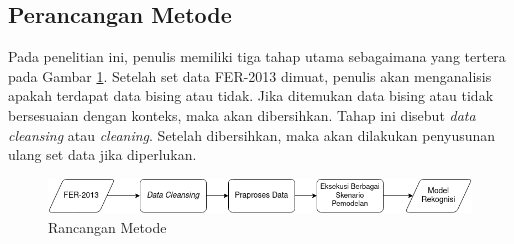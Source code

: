 \subsection{Perancangan Metode}
Pada penelitian ini, penulis memiliki tiga tahap utama sebagaimana yang tertera pada Gambar \ref{fig:rancanganmetode}. Setelah set data FER-2013 dimuat, penulis akan menganalisis apakah terdapat data bising atau tidak. Jika ditemukan data bising atau tidak bersesuaian dengan konteks, maka akan dibersihkan.  Tahap ini disebut \textit{data cleansing} atau \textit{cleaning}. Setelah dibersihkan, maka akan dilakukan penyusunan ulang set data jika diperlukan.
\begin{figure}
    \centering
    \includegraphics[width=14cm]{gambar/perancangan_metode.png}
    \caption{Rancangan Metode}
    \label{fig:rancanganmetode}
\end{figure}

